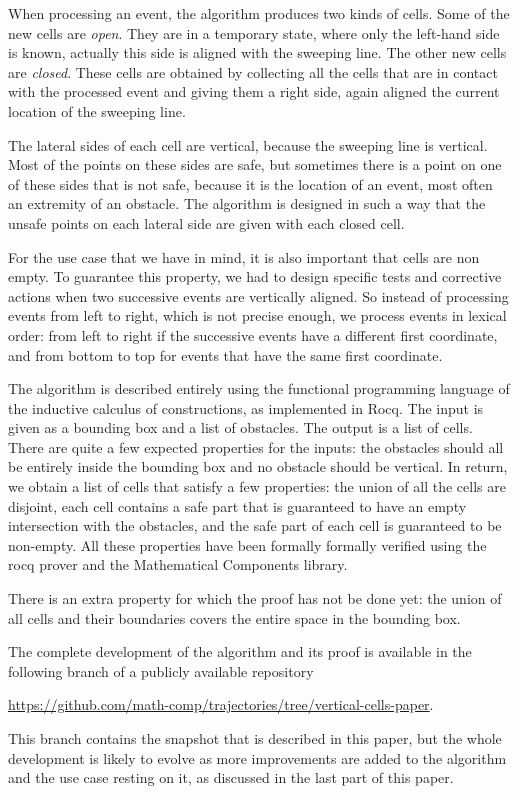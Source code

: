 \documentclass[a4paper, USenglish, cleveref, autoref, thm-restate]{lipics-v2021}
\begin{document}
When processing an event, the algorithm produces two kinds of cells.
Some of the new cells are {\em open}.  They are in a temporary state,
where only the left-hand side is known, actually this side is aligned
with the sweeping line.  The other new cells are {\em closed}.  These
cells are obtained by collecting all the cells that are in contact
with the processed event and giving them a right side, again aligned
the current location of the sweeping line.

The lateral sides of each cell are vertical, because the sweeping line
is vertical.  Most of the points on these sides are safe, but
sometimes there is a point on one of these sides that is not safe,
because it is the location of an event, most often an extremity of an
obstacle.  The algorithm is designed in such a way that the unsafe
points on each lateral side are given with each closed cell.

For the use case that we have in mind, it is also important that cells
are non empty.  To guarantee this property, we had to design specific
tests and corrective actions when two successive events are vertically
aligned.  So instead of processing events from left to right, which is
not precise enough, we process events in lexical order: from left to
right if the successive events have a different first coordinate, and
from bottom to top for events that have the same first coordinate.

The algorithm is described entirely using the functional programming
language of the inductive calculus of constructions, as implemented in
Rocq.  The input is given as a bounding box and a list of obstacles.
The output is a list of cells.  There are quite a few expected
properties for the inputs: the obstacles should all be entirely inside
the bounding box and no obstacle should be vertical.  In return, we
obtain a list of cells that satisfy a few properties: the union of all
the cells are disjoint, each cell contains a safe part that is guaranteed to
have an empty intersection with the obstacles, and the safe part of
each cell is guaranteed to be non-empty.  All these properties have
been formally formally verified using the rocq prover and the {\sc
  Mathematical Components} library.

There is an extra property for which the proof has not be done yet:
the union of all cells and their boundaries covers the entire space in the
bounding box.

The complete development of the algorithm and its proof is available
in the following branch of a publicly available repository
\begin{center}
\url{https://github.com/math-comp/trajectories/tree/vertical-cells-paper}.
\end{center}
This branch contains the snapshot that is described in this paper, but
the whole development is likely to evolve as more improvements are
added to the algorithm and the use case resting on it, as discussed in the
last part of this paper.
\end{document}

